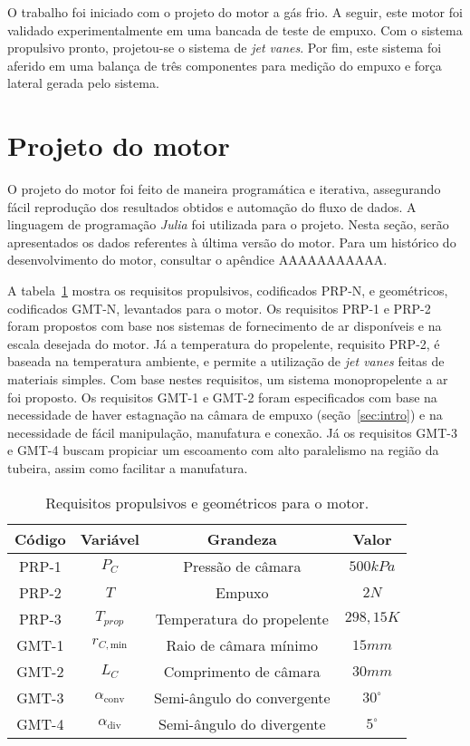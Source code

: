 
O trabalho foi iniciado com o projeto do motor a gás frio. A seguir, este motor foi validado experimentalmente em uma bancada de teste de empuxo. Com o sistema propulsivo pronto, projetou-se o sistema de \textit{jet vanes}. Por fim, este sistema foi aferido em uma balança de três componentes para medição do empuxo e força lateral gerada pelo sistema. 

\section{Projeto do motor}\label{sec:motor_project}

O projeto do motor foi feito de maneira programática e iterativa, assegurando fácil reprodução dos resultados obtidos e automação do fluxo de dados. A linguagem de programação \textit{Julia} foi utilizada para o projeto. Nesta seção, serão apresentados os dados referentes à última versão do motor. Para um histórico do desenvolvimento do motor, consultar o apêndice AAAAAAAAAAA.  

A tabela~\ref{tab:requirements} mostra os requisitos propulsivos, codificados PRP-N, e geométricos, codificados GMT-N, levantados para o motor. Os requisitos PRP-1 e PRP-2 foram propostos com base nos sistemas de fornecimento de ar disponíveis e na escala desejada do motor. Já a temperatura do propelente, requisito PRP-2, é baseada na temperatura ambiente, e permite a utilização de \textit{jet vanes} feitas de materiais simples. Com base nestes requisitos, um sistema monopropelente a ar foi proposto. Os requisitos GMT-1 e GMT-2 foram especificados com base na necessidade de haver estagnação na câmara de empuxo (seção~\ref{sec:intro}) e na necessidade de fácil manipulação, manufatura e conexão. Já os requisitos GMT-3 e GMT-4 buscam propiciar um escoamento com alto paralelismo na região da tubeira, assim como facilitar a manufatura.

\begin{table}[]
    \centering\begin{tabular}{cccc} \toprule
        Código & Variável & Grandeza & Valor \\ \midrule
        PRP-1 & \(P_C\) & Pressão de câmara & \(500kPa\) \\
        PRP-2 & \(T\) & Empuxo & \(2N\) \\
        PRP-3 &\(T_{prop}\) & Temperatura do propelente & \(298,15K\) \\
        GMT-1 & \(r_{C,\text{min}}\) & Raio de câmara mínimo & \(15mm\) \\
        GMT-2 & \(L_C\) & Comprimento de câmara & \(30mm\) \\
        GMT-3 & \(\alpha_{\text{conv}}\) & Semi-ângulo do convergente & \(30^\circ \) \\
        GMT-4 & \(\alpha_{\text{div}}\) & Semi-ângulo do divergente & \(5^\circ \) \\ \bottomrule 
    \end{tabular}
    \caption{Requisitos propulsivos e geométricos para o motor.}
    \label{tab:requirements}
\end{table}

